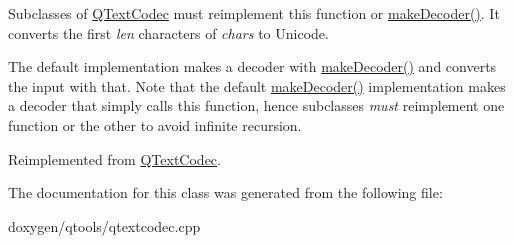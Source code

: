 Subclasses of \mbox{\hyperlink{class_q_text_codec}{Q\+Text\+Codec}} must reimplement this function or \mbox{\hyperlink{class_q_text_codec_abb65882aa316a2ad49a10e9f86c4dc88}{make\+Decoder()}}. It converts the first {\itshape len} characters of {\itshape chars} to Unicode.

The default implementation makes a decoder with \mbox{\hyperlink{class_q_text_codec_abb65882aa316a2ad49a10e9f86c4dc88}{make\+Decoder()}} and converts the input with that. Note that the default \mbox{\hyperlink{class_q_text_codec_abb65882aa316a2ad49a10e9f86c4dc88}{make\+Decoder()}} implementation makes a decoder that simply calls this function, hence subclasses {\itshape must} reimplement one function or the other to avoid infinite recursion. 

Reimplemented from \mbox{\hyperlink{class_q_text_codec_aafe2c454ae7cbbf3d84a7ca26f775c49}{Q\+Text\+Codec}}.



The documentation for this class was generated from the following file\+:\begin{DoxyCompactItemize}
\item 
doxygen/qtools/qtextcodec.\+cpp\end{DoxyCompactItemize}
